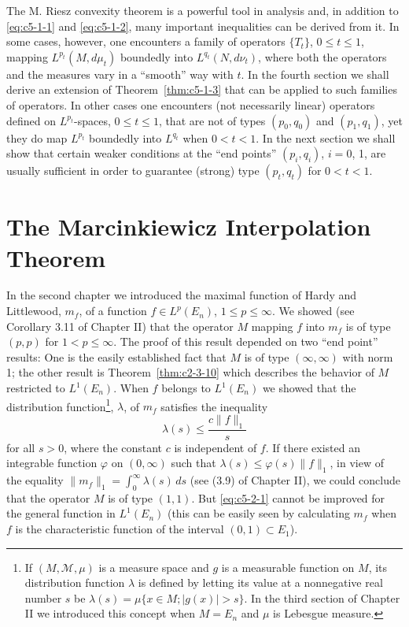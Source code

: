 The M. Riesz convexity theorem is a powerful tool in analysis and, in addition
to \eqref{eq:c5-1-1} and \eqref{eq:c5-1-2}, many important inequalities can be
derived from it. In some cases, however, one encounters a family of operators
$\{T_{t}\}$, $0 \leq t \leq 1$, mapping $L^{p_{t}}(M, d\mu_{t})$ boundedly into
$L^{q_{t}}(N, d\nu_{t})$, where both the operators and the measures vary in a
``smooth'' way with $t$. In the fourth section we shall derive an extension of
Theorem~\ref{thm:c5-1-3} that can be applied to such families of operators. In
other cases one encounters (not necessarily linear) operators defined on
$L^{p_{t}}$-spaces, $0 \leq t \leq 1$, that are not of types $(p_{0}, q_{0})$
and $(p_{1}, q_{1})$, yet they do map $L^{p_{t}}$ boundedly into $L^{q_{t}}$
when $0 < t < 1$. In the next section we shall show that certain weaker
conditions at the ``end points'' $(p_{i}, q_{i})$, $i = 0$, 1, are usually
sufficient in order to guarantee (strong) type $(p_{t}, q_{t})$ for
$0 < t < 1$.

\section{The Marcinkiewicz Interpolation Theorem}

In the second chapter we introduced the maximal function of Hardy and
Littlewood, $m_{f}$, of a function $f \in L^{p}(E_{n})$, $1 \leq p \leq \infty$.
We showed (see Corollary 3.11 of Chapter II) that the operator
$M$ mapping $f$ into $m_{f}$ is of type $(p, p)$ for $1 < p \leq \infty$. The
proof of this result depended on two ``end point'' results: One is the easily
established fact that $M$ is of type $(\infty, \infty)$ with norm 1; the other
result is Theorem~\ref{thm:c2-3-10} which describes the behavior of $M$
restricted to $L^{1}(E_{n})$. When $f$ belongs to $L^{1}(E_{n})$ we showed that
the distribution
function\footnote{If $(M, \mathcal{M}, \mu)$ is a measure space and $g$ is a
measurable function on $M$, its distribution function $\lambda$ is defined by
letting its value at a nonnegative real number $s$ be
$\lambda(s) = \mu\{x \in M ; |g(x)| > s\}$. In the third section of Chapter II
we introduced this concept when $M = E_{n}$ and $\mu$ is Lebesgue measure.},
$\lambda$, of $m_{f}$ satisfies the inequality
\begin{equation}\label{eq:c5-2-1}
\lambda(s)\leq\frac{c\|f\|_{1}}{s}
\end{equation}
for all $s > 0$, where the constant $c$ is independent of $f$. If there existed
an integrable function $\varphi$ on $(0, \infty)$ such that
$\lambda(s) \leq \varphi(s)\|f\|_{1}$, in view of the equality
$\|m_{f}\|_{1} = \int_{0}^{\infty}\lambda(s)\,ds$ (see (3.9) of
Chapter II), we could conclude that the operator $M$ is of type $(1, 1)$. But
\eqref{eq:c5-2-1} cannot be improved for the general function in $L^{1}(E_{n})$
(this can be easily seen by calculating $m_{f}$ when $f$ is the characteristic
function of the interval $(0, 1) \subset E_{1}$).

